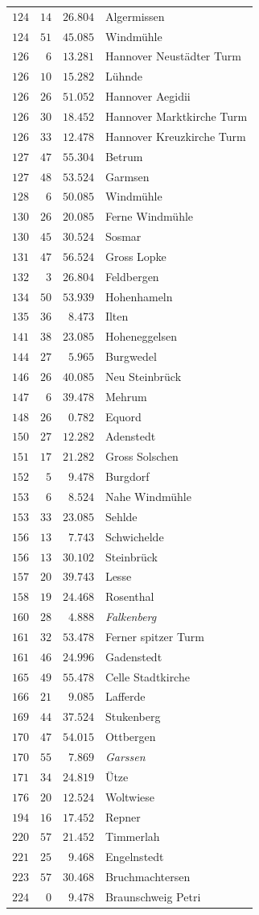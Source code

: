 \begin{longtable}{@{}rrrp{.61\linewidth}@{}}
\(124\)&\(14\)&\(26.804\)&\raggedright Algermissen\tabularnewline
\(124\)&\(51\)&\(45.085\)&\raggedright Windmühle\tabularnewline
\(126\)&\(6\)&\(13.281\)&\raggedright Hannover Neustädter Turm\tabularnewline
\(126\)&\(10\)&\(15.282\)&\raggedright Lühnde\tabularnewline
\(126\)&\(26\)&\(51.052\)&\raggedright Hannover Aegidii\tabularnewline
\(126\)&\(30\)&\(18.452\)&\raggedright Hannover Marktkirche Turm\tabularnewline
\(126\)&\(33\)&\(12.478\)&\raggedright Hannover Kreuzkirche Turm\tabularnewline
\(127\)&\(47\)&\(55.304\)&\raggedright Betrum\tabularnewline
\(127\)&\(48\)&\(53.524\)&\raggedright Garmsen\tabularnewline
\(128\)&\(6\)&\(50.085\)&\raggedright Windmühle\tabularnewline
\(130\)&\(26\)&\(20.085\)&\raggedright Ferne Windmühle\tabularnewline
\(130\)&\(45\)&\(30.524\)&\raggedright Sosmar\tabularnewline
\(131\)&\(47\)&\(56.524\)&\raggedright Gross Lopke\tabularnewline
\(132\)&\(3\)&\(26.804\)&\raggedright Feldbergen\tabularnewline
\(134\)&\(50\)&\(53.939\)&\raggedright Hohenhameln\tabularnewline
\(135\)&\(36\)&\(8.473\)&\raggedright Ilten\tabularnewline
\(141\)&\(38\)&\(23.085\)&\raggedright Hoheneggelsen\tabularnewline
\(144\)&\(27\)&\(5.965\)&\raggedright Burgwedel\tabularnewline
\(146\)&\(26\)&\(40.085\)&\raggedright Neu Steinbrück\tabularnewline
\(147\)&\(6\)&\(39.478\)&\raggedright Mehrum\tabularnewline
\(148\)&\(26\)&\(0.782\)&\raggedright Equord\tabularnewline
\(150\)&\(27\)&\(12.282\)&\raggedright Adenstedt\tabularnewline
\(151\)&\(17\)&\(21.282\)&\raggedright Gross Solschen\tabularnewline
\(152\)&\(5\)&\(9.478\)&\raggedright Burgdorf\tabularnewline
\(153\)&\(6\)&\(8.524\)&\raggedright Nahe Windmühle\tabularnewline
\(153\)&\(33\)&\(23.085\)&\raggedright Sehlde\tabularnewline
\(156\)&\(13\)&\(7.743\)&\raggedright Schwichelde\tabularnewline
\(156\)&\(13\)&\(30.102\)&\raggedright Steinbrück\tabularnewline
\(157\)&\(20\)&\(39.743\)&\raggedright Lesse\tabularnewline
\(158\)&\(19\)&\(24.468\)&\raggedright Rosenthal\tabularnewline
\(160\)&\(28\)&\(4.888\)&\raggedright \textit{Falkenberg}\tabularnewline
\(161\)&\(32\)&\(53.478\)&\raggedright Ferner spitzer Turm\tabularnewline
\(161\)&\(46\)&\(24.996\)&\raggedright Gadenstedt\tabularnewline
\(165\)&\(49\)&\(55.478\)&\raggedright Celle Stadtkirche\tabularnewline
\(166\)&\(21\)&\(9.085\)&\raggedright Lafferde\tabularnewline
\(169\)&\(44\)&\(37.524\)&\raggedright Stukenberg\tabularnewline
\(170\)&\(47\)&\(54.015\)&\raggedright Ottbergen\tabularnewline
\(170\)&\(55\)&\(7.869\)&\raggedright \textit{Garssen}\tabularnewline
\(171\)&\(34\)&\(24.819\)&\raggedright Ütze\tabularnewline
\(176\)&\(20\)&\(12.524\)&\raggedright Woltwiese\tabularnewline
\(194\)&\(16\)&\(17.452\)&\raggedright Repner\tabularnewline
\(220\)&\(57\)&\(21.452\)&\raggedright Timmerlah\tabularnewline
\(221\)&\(25\)&\(9.468\)&\raggedright Engelnstedt\tabularnewline
\(223\)&\(57\)&\(30.468\)&\raggedright Bruchmachtersen\tabularnewline
\(224\)&\(0\)&\(9.478\)&\raggedright Braunschweig Petri\tabularnewline
\end{longtable}
\endgroup
